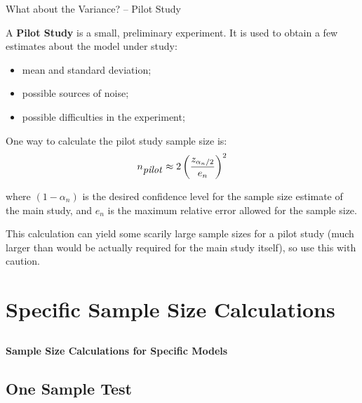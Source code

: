 \begin{frame}{What about the Variance? -- Pilot Study}{}

  A {\bf Pilot Study} is a small, preliminary experiment. It is used
  to obtain a few estimates about the model under study:
  \begin{itemize}
  \item mean and standard deviation;
  \item possible sources of noise;
  \item possible difficulties in the experiment;
  \end{itemize}

  One way to calculate the pilot study sample size is:
  \begin{equation*}
    n_{\mbox{\textit{pilot}}}\approx 2\left(\frac{z_{\alpha_n/2}}{e_{n}}\right)^2
  \end{equation*}

  \noindent where $(1-\alpha_{n})$ is the desired confidence level for
  the sample size estimate of the main study, and $e_n$ is the maximum
  relative error allowed for the sample size.\bigskip

  This calculation can yield some scarily large sample sizes for a
  pilot study (much larger than would be actually required for the
  main study itself), so use this with caution.
\end{frame}


\section{Specific Sample Size Calculations}
\subsection{}
\begin{frame}{}
  \begin{center}
    {\bf Sample Size Calculations for Specific Models}
  \end{center}
\end{frame}


\subsection{One Sample Test}

